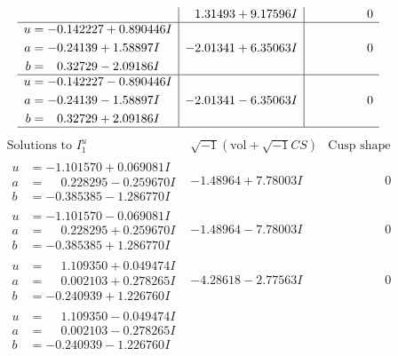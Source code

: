 \documentclass[1p]{elsarticle_modified}
\theoremstyle{definition}
\newcommand{\I}{\sqrt{-1}}
\begin{document}
$$\begin{array}{c|c|c}
 & \phantom{-}1.31493 + 9.17596 I & \phantom{-0.000000 } 0 \\ \hline\begin{aligned}
u &= -0.142227 + 0.890446 I \\
a &= -0.24139 + 1.58897 I \\
b &= \phantom{-}0.32729 - 2.09186 I\end{aligned}
 & -2.01341 + 6.35063 I & \phantom{-0.000000 } 0 \\ \hline\begin{aligned}
u &= -0.142227 - 0.890446 I \\
a &= -0.24139 - 1.58897 I \\
b &= \phantom{-}0.32729 + 2.09186 I\end{aligned}
 & -2.01341 - 6.35063 I & \phantom{-0.000000 } 0\\
 \hline 
 \end{array}$$\newpage$$\begin{array}{c|c|c}  
\text{Solutions to }I^u_{1}& \I (\text{vol} + \sqrt{-1}CS) & \text{Cusp shape}\\
 \hline 
\begin{aligned}
u &= -1.101570 + 0.069081 I \\
a &= \phantom{-}0.228295 - 0.259670 I \\
b &= -0.385385 - 1.286770 I\end{aligned}
 & -1.48964 + 7.78003 I & \phantom{-0.000000 } 0 \\ \hline\begin{aligned}
u &= -1.101570 - 0.069081 I \\
a &= \phantom{-}0.228295 + 0.259670 I \\
b &= -0.385385 + 1.286770 I\end{aligned}
 & -1.48964 - 7.78003 I & \phantom{-0.000000 } 0 \\ \hline\begin{aligned}
u &= \phantom{-}1.109350 + 0.049474 I \\
a &= \phantom{-}0.002103 + 0.278265 I \\
b &= -0.240939 + 1.226760 I\end{aligned}
 & -4.28618 - 2.77563 I & \phantom{-0.000000 } 0 \\ \hline\begin{aligned}
u &= \phantom{-}1.109350 - 0.049474 I \\
a &= \phantom{-}0.002103 - 0.278265 I \\
b &= -0.240939 - 1.226760 I\end{aligned}

\end{array}$$
\end{document}
